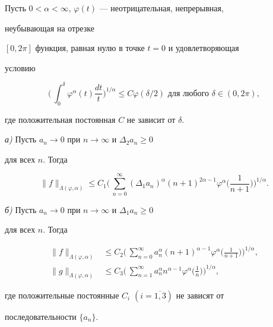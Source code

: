 \begin{assrt}


Пусть $0<\alpha<\infty$, $\varphi(t)$ --- неотрицательная, непрерывная,


неубывающая на отрезке


$[0,2\pi]$ функция, равная нулю в точке $t=0$ и удовлетворяющая


условию


$$


\biggl(\,\int^\delta_0 \varphi^\alpha(t)\frac{dt}{t}


\biggr)^{1/\alpha}\le C\varphi(\delta/2)


\text{ для любого } \delta\in(0,2\pi),


$$


где положительная постоянная $C$ не зависит от $\delta$.





{\em а)} Пусть $a_n\to 0$ при $n\to\infty$ и $\Delta_2a_n\ge 0$


для всех $n$. Тогда


\begin{equation}


\|f\|_{\Lambda(\varphi,\alpha)}\le C_1


\biggl(\,\sum^\infty_{n=0}(\Delta_1a_n)^\alpha(n+1)^{2\alpha-1}


\varphi^\alpha\biggl(\frac{1}{n+1} \biggr)


\biggr)^{1/\alpha}.


\end{equation}





{\em б)} Пусть $a_n\to 0$ при $n\to\infty$ и $\Delta_1a_n\ge 0$


для всех $n$. Тогда


\begin{align}


\|f\|_{\Lambda(\varphi,\alpha)}&\le C_2\biggl(\,


\sum^\infty_{n=0}a^\alpha_n(n+1)^{\alpha-1}\varphi^\alpha


\biggl(\frac{1}{n+1} \biggr)\biggr)^{1/\alpha},\\


\|g\|_{\Lambda(\varphi,\alpha)}&\le C_3\biggl(\,


\sum^\infty_{n=1}a^\alpha_n n^{\alpha-1}\varphi^\alpha


\biggl(\frac{1}{n} \biggr)\biggr)^{1/\alpha},


\end{align}


где положительные постоянные $C_i$ $(i=\overline{1,3})$ не зависят от


последовательности $\{a_n\}$.


\end{assrt}





